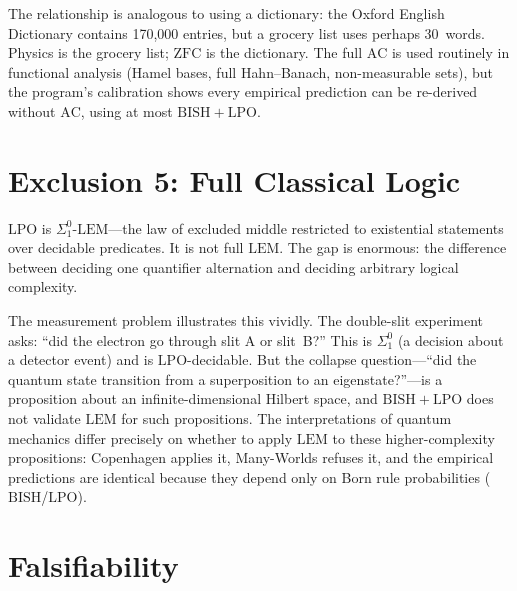 \documentclass[11pt,a4paper]{report}
\theoremstyle{plain}
\theoremstyle{definition}
\theoremstyle{remark}
\newcommand{\BISH}{\mathrm{BISH}}
\newcommand{\LPO}{\mathrm{LPO}}
\newcommand{\LEM}{\mathrm{LEM}}
\newcommand{\ZFC}{\mathrm{ZFC}}
\newcommand{\AC}{\mathrm{AC}}
\begin{document}
The relationship is analogous to using a dictionary: the Oxford English Dictionary contains 170{,}000 entries, but a grocery list uses perhaps 30~words. Physics is the grocery list; $\ZFC$ is the dictionary. The full $\AC$ is used routinely in functional analysis (Hamel bases, full Hahn--Banach, non-measurable sets), but the program's calibration shows every empirical prediction can be re-derived without $\AC$, using at most $\BISH+\LPO$.

\section{Exclusion 5: Full Classical Logic}

$\LPO$ is $\Sigma^0_1$-$\LEM$---the law of excluded middle restricted to existential statements over decidable predicates. It is not full $\LEM$. The gap is enormous: the difference between deciding one quantifier alternation and deciding arbitrary logical complexity.

The measurement problem illustrates this vividly. The double-slit experiment asks: ``did the electron go through slit A or slit~B?'' This is $\Sigma^0_1$ (a decision about a detector event) and is $\LPO$-decidable. But the collapse question---``did the quantum state transition from a superposition to an eigenstate?''---is a proposition about an infinite-dimensional Hilbert space, and $\BISH+\LPO$ does not validate $\LEM$ for such propositions. The interpretations of quantum mechanics differ precisely on whether to apply $\LEM$ to these higher-complexity propositions: Copenhagen applies it, Many-Worlds refuses it, and the empirical predictions are identical because they depend only on Born rule probabilities ($\BISH$/$\LPO$).

\section{Falsifiability}
\end{document}
